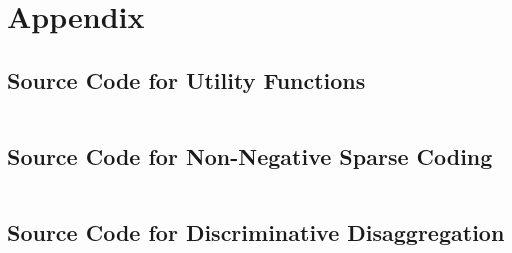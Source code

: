 \documentclass[a4paper]{article}
\begin{document}

\newpage






%
%


\newpage
\section{Appendix}
\label{sec:appendix}

\subsection{Source Code for Utility Functions}
\inputminted[mathescape,linenos,numbersep=5pt,gobble=0,frame=lines,framesep=2mm]{python}{util.py}

\newpage

\subsection{Source Code for Non-Negative Sparse Coding}
\label{sec:sc_nnsc}
\inputminted[mathescape,linenos,numbersep=5pt,gobble=0,frame=lines,framesep=2mm]{python}{nnsc.py}

\newpage

\subsection{Source Code for Discriminative Disaggregation}
\label{sec:sc_dd}
\inputminted[mathescape,linenos,numbersep=5pt,gobble=0,frame=lines,framesep=2mm]{python}{dd.py}
%
\end{document}

